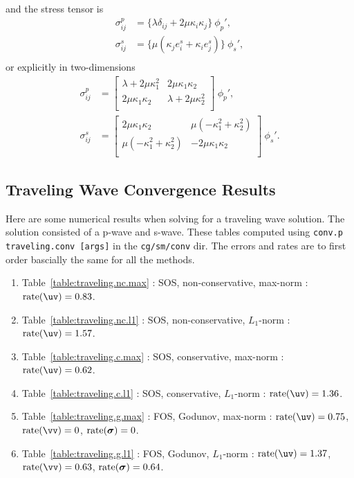 and the stress tensor is
\begin{align*}
  \sigma_{ij}^p &= \big\{ \lambda\delta_{ij} + 2\mu\kappa_i\kappa_j \big\}~\phi_p', \\
  \sigma_{ij}^s &= \big\{                      \mu( \kappa_j e^s_i + \kappa_i e^s_j ) \big\}~\phi_s', \\
\end{align*}
or explicitly in two-dimensions
\begin{align*}
  \sigma_{ij}^p &=  \begin{bmatrix}  \lambda+2\mu\kappa_1^2 & 2\mu\kappa_1\kappa_2\\
                                    2\mu\kappa_1\kappa_2 & \lambda+2\mu\kappa_2^2\\
                    \end{bmatrix} ~\phi_p' , \\
  \sigma_{ij}^s &=  \begin{bmatrix}  2\mu\kappa_1\kappa_2 & \mu(-\kappa_1^2+\kappa_2^2)\\
                                    \mu(-\kappa_1^2+\kappa_2^2) &  -2\mu\kappa_1\kappa_2\\
                    \end{bmatrix}~\phi_s' .
\end{align*}

\subsection{Traveling Wave Convergence Results}

Here are some numerical results when solving for a traveling wave solution. The solution consisted
of a p-wave and s-wave. 
These tables computed using
{\tt conv.p traveling.conv [args]} in the {\tt cg/sm/conv} dir. The errors and rates are to first order
bascially the same for all the methods. 
\begin{enumerate}
  \item Table~\ref{table:traveling.nc.max} : SOS, non-conservative, max-norm : $\rate(\uv)=0.83$.
  \item Table~\ref{table:traveling.nc.l1} : SOS, non-conservative, $L_1$-norm : $\rate(\uv)=1.57$.
  \item Table~\ref{table:traveling.c.max} : SOS, conservative, max-norm : $\rate(\uv)=0.62$.
  \item Table~\ref{table:traveling.c.l1} : SOS, conservative, $L_1$-norm : $\rate(\uv)=1.36$.
  \item Table~\ref{table:traveling.g.max} : FOS, Godunov, max-norm : $\rate(\uv)=0.75$, $\rate(\vv)=0$, ${\rm rate}(\boldsymbol{\sigma})=0$.
  \item Table~\ref{table:traveling.g.l1} : FOS, Godunov, $L_1$-norm : $\rate(\uv)=1.37$, $\rate(\vv)=0.63$, ${\rm rate}(\boldsymbol{\sigma})=0.64$.
\end{enumerate}

